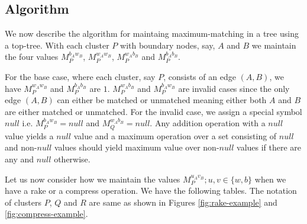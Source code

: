 \documentclass[a4paper,12pt]{article}
\begin{document}
\subsection{Algorithm}
We now describe the algorithm for maintaing maximum-matching in a tree using a top-tree. With each cluster $P$ with boundary nodes, say, $A$ and $B$ we maintain the four values $M_{P}^{b_{A}w_{B}}$, $M_{P}^{w_{A}w_{B}}$, $M_{P}^{w_{A}b_{B}}$ and $M_{P}^{b_{A}b_{B}}$.

For the base case, where each cluster, say $P$, consists of an edge $(A,B)$, we have $M_{P}^{w_{A}w_{B}}$ and $M_{P}^{b_{A}b_{B}}$ are $1$. $M_{P}^{w_{A}b_{B}}$ and $M_{P}^{b_{A}w_{B}}$ are invalid cases since the only edge $(A,B)$ can either be matched or unmatched meaning either both $A$ and $B$ are either matched or unmatched. For the invalid case, we assign a special symbol $null$ i.e. $M_{P}^{b_{A}w_{B}}=null$ and $M_{Q}^{w_{A}b_{B}}=null$. Any addition operation with a $null$ value yields a $null$ value and a maximum operation over a set consisting of $null$ and non-$null$ values should yield maximum value over non-$null$ values if there are any and $null$ otherwise.

Let us now consider how we maintain the values $M_{P}^{u_{A}v_{B}}; u,v \in \{w,b\}$ when we have a rake or a compress operation. We have the following tables. The notation of clusters $P$, $Q$ and $R$ are same as shown in Figures \ref{fig:rake-example} and \ref{fig:compress-example}.
\end{document}
